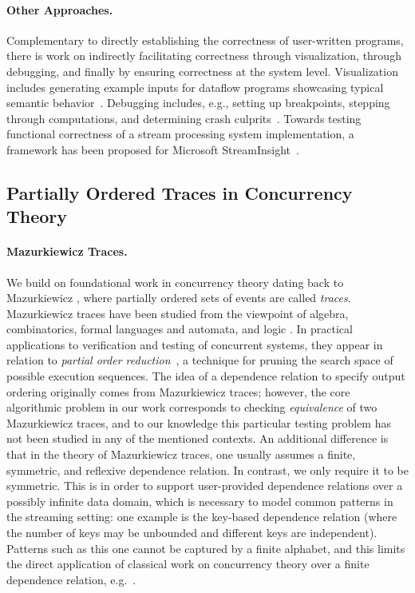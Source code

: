 \paragraph{Other Approaches.}
Complementary to directly establishing the correctness of user-written programs, there is work on indirectly facilitating correctness through visualization, through debugging, and finally by ensuring correctness at the system level.
Visualization includes generating example inputs for dataflow programs showcasing typical semantic behavior~\cite{olston2009generating}. Debugging includes, e.g., setting up breakpoints, stepping through computations, and determining crash culprits~\cite{gulzar2016bigdebug,olston2011inspector}.
Towards testing functional correctness of a stream processing system implementation, a framework has been proposed for Microsoft StreamInsight~\cite{raizman2010extensible}.

\subsection{Partially Ordered Traces in Concurrency Theory}

\paragraph{Mazurkiewicz Traces.}
We build on foundational work in concurrency theory dating back to Mazurkiewicz \cite{mazurkiewicz1986trace}, where partially ordered sets of events are called \emph{traces}. Mazurkiewicz traces have been studied from the
viewpoint of algebra, combinatorics, formal languages and automata, and
logic \cite{DiekertR1995}. In practical applications to verification and
testing of concurrent systems, they appear in relation to
\emph{partial order reduction}~\cite{God96,Peled94}, a technique for
pruning the search space of possible execution sequences.
The idea of a dependence relation to specify output ordering originally comes from Mazurkiewicz traces; however, the core algorithmic problem in our work corresponds to checking \emph{equivalence} of two Mazurkiewicz traces, and to our knowledge this particular testing problem has not been studied in any of the mentioned contexts.
An additional difference is that in the theory of Mazurkiewicz traces, one usually assumes a finite, symmetric, and reflexive dependence relation. In contrast, we only require it to be symmetric. This is in order to support user-provided dependence relations over a possibly infinite data domain, which is necessary to model common patterns in the streaming setting: one example is the key-based dependence relation (where the number of keys may be unbounded and different keys are independent). Patterns such as this one cannot be captured by a finite alphabet, and this limits the direct application of classical work on concurrency theory over a finite dependence relation, e.g.~\cite{DiekertR1995}.

